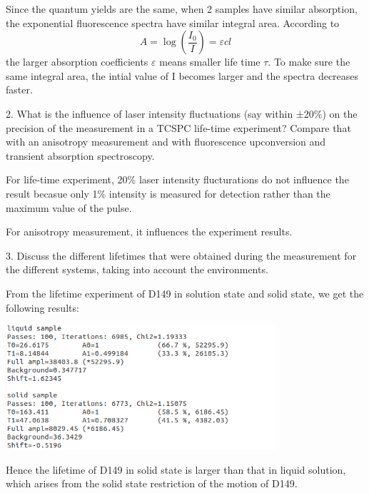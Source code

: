 \documentclass{article}
\begin{document}
Since the quantum yields are the same, when 2 samples have similar absorption, the exponential fluorescence spectra have similar integral area. According to 
\begin{equation}
A=\log (\frac{I_0}{I})=\varepsilon cl
\end{equation}
the larger absorption coefficients $\varepsilon$ means smaller life time $\tau$. To make sure the same integral area, the intial value of I becomes larger and the spectra decreases faster.\\ \par 


2.  What is the influence of laser intensity fluctuations (say within ±20\%) on the precision of the
measurement in a TCSPC life-time experiment? Compare that with an anisotropy measurement and with
fluorescence upconversion and transient absorption spectroscopy.\\ \par 
For life-time experiment, 20\% laser intensity flucturations do not influence the result becasue only 1\% intensity is measured for detection rather than the maximum value of the pulse.\par 
For anisotropy measurement, it influences the experiment results.\\ \par 

3. Discuss the different lifetimes that were obtained during the measurement for the different systems,
taking into account the environments. \\ \par 
From the lifetime experiment of D149 in solution state and solid state, we get the following results:
\begin{center}
\includegraphics[width=10cm]{result1}
\end{center}
Hence the lifetime of D149 in solid state is larger than that in liquid solution, which arises from the solid state restriction of the motion of D149.\\ \par 
\end{document}
